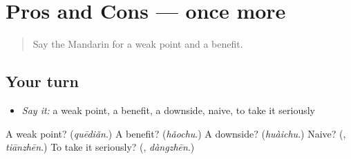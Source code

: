 \section[(dialogue)]{Pros and Cons — once more}

\label{lesson:ZH-R373-review-final-373}



\begin{quote}
Say the Mandarin for a weak point and a benefit.
\end{quote}

\subsection*{Your turn}
\begin{itemize}
\raggedright
  \item \emph{Say it:} a weak point, a benefit, a downside, naive, to take it seriously
\end{itemize}

\begin{tcolorbox}[breakable,colback=teal!4,colframe=teal!35!black,title={Before you move on}]
A weak point? (\emph{quēdiǎn}.) A benefit? (\emph{hǎochu}.) A downside? (\emph{huàichu}.) Naive? (\textbf{}, \emph{tiānzhēn}.) To take it seriously? (\textbf{}, \emph{dàngzhēn}.)
\end{tcolorbox}
